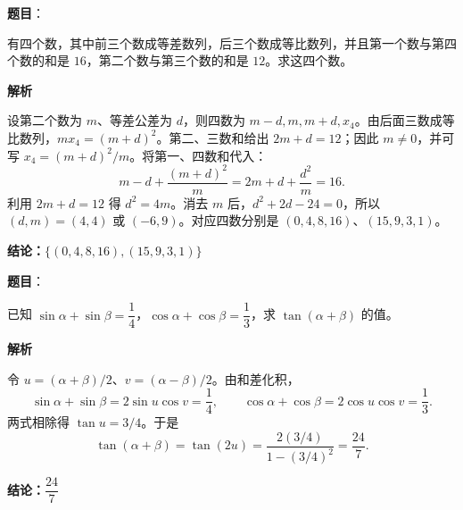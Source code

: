 \begin{answer}

\textbf{题目}：

有四个数，其中前三个数成等差数列，后三个数成等比数列，并且第一个数与第四个数的和是 $16$，第二个数与第三个数的和是 $12$。求这四个数。

\textbf{解析}

设第二个数为 $m$、等差公差为 $d$，则四数为 $m-d,m,m+d,x_4$。由后面三数成等比数列，$m x_4=(m+d)^2$。第二、三数和给出 $2m+d=12$；因此 $m\ne0$，并可写 $x_4=(m+d)^2/m$。将第一、四数和代入：
\nopagebreak[4]
\[
m-d+\frac{(m+d)^2}{m}=2m+d+\frac{d^2}{m}=16.
\]
利用 $2m+d=12$ 得 $d^2=4m$。消去 $m$ 后，$d^2+2d-24=0$，所以 $(d,m)=(4,4)$ 或 $(-6,9)$。对应四数分别是 $(0,4,8,16)$、$(15,9,3,1)$。

\textbf{结论：$\{(0,4,8,16),(15,9,3,1)\}$}


\end{answer}
\begin{answer}

\textbf{题目}：

已知 $\sin\alpha+\sin\beta=\dfrac14$，$\cos\alpha+\cos\beta=\dfrac13$，求 $\tan(\alpha+\beta)$ 的值。

\textbf{解析}

令 $u=(\alpha+\beta)/2$、$v=(\alpha-\beta)/2$。由和差化积，
\nopagebreak[4]
\[
\sin\alpha+\sin\beta=2\sin u\cos v=\frac14,\qquad
\cos\alpha+\cos\beta=2\cos u\cos v=\frac13.
\]
两式相除得 $\tan u=3/4$。于是
\nopagebreak[4]
\[
\tan(\alpha+\beta)=\tan(2u)=\frac{2(3/4)}{1-(3/4)^2}=\frac{24}{7}.
\]

\textbf{结论：$\dfrac{24}{7}$}


\end{answer}
